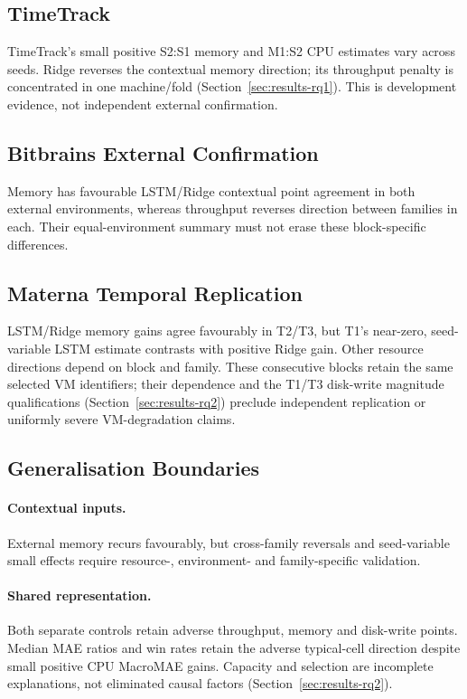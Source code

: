 \documentclass[a4paper,fleqn]{cas-dc}
\begin{document}


\subsection{TimeTrack}

TimeTrack's small positive S2:S1 memory and M1:S2 CPU estimates vary across
seeds. Ridge reverses the contextual memory direction; its throughput penalty
is concentrated in one machine/fold (Section~\ref{sec:results-rq1}).
This is development evidence, not independent external confirmation.

\subsection{Bitbrains External Confirmation}

Memory has favourable LSTM/Ridge contextual point agreement in both external
environments, whereas throughput reverses direction between families in each.
Their equal-environment summary must not erase these block-specific differences.

\subsection{Materna Temporal Replication}

LSTM/Ridge memory gains agree favourably in T2/T3, but T1's near-zero,
seed-variable LSTM estimate contrasts with positive Ridge gain. Other resource
directions depend on block and family. These consecutive blocks retain the
same selected VM identifiers; their dependence and the T1/T3 disk-write
magnitude qualifications (Section~\ref{sec:results-rq2}) preclude independent
replication or uniformly severe VM-degradation claims.

\subsection{Generalisation Boundaries}

\paragraph{Contextual inputs.}
External memory recurs favourably, but cross-family reversals and seed-variable
small effects require resource-, environment- and family-specific validation.

\paragraph{Shared representation.}
Both separate controls retain adverse throughput, memory and disk-write
points. Median MAE ratios and win rates retain the adverse typical-cell
direction despite small positive CPU MacroMAE gains. Capacity and selection
are incomplete explanations, not eliminated causal factors
(Section~\ref{sec:results-rq2}).
\end{document}
